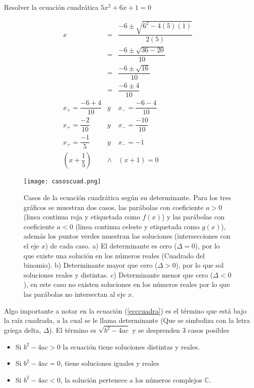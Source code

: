 \begin{myexample}
Resolver la ecuación cuadrática $5x^{2}+6x+1=0$
\end{myexample}
\begin{eqnarray*}
x&=&\dfrac{-6\pm\sqrt{6^{2}-4(5)(1)}}{2(5)}\\
&=&\dfrac{-6\pm\sqrt{36-20}}{10}\\
&=&\dfrac{-6\pm\sqrt{16}}{10}\\
&=&\dfrac{-6\pm 4}{10}\\
x_{+}=\dfrac{-6+ 4}{10} &y& x_{-}=\dfrac{-6- 4}{10}\\
x_{+}=\dfrac{-2}{10} &y& x_{-}=\dfrac{-10}{10}\\
x_{+}=\dfrac{-1}{5} &y& x_{-}=-1\\
\left(x+\dfrac{1}{5}\right)&\wedge &\left( x+1\right)=0
\end{eqnarray*}
\newpage
\begin{center}
\begin{figure}[h!]
\centering
\texttt{[image: casoscuad.png]}
\caption[Casos de la ecuación cuadrática según su determinante.]{Casos de la ecuación cuadrática según su determinante. Para los tres gráficos se muestran dos casos, las parábolas con coeficiente $a>0$ (linea continua roja y etiquetada como $f(x)$) y las parábolas con coeficiente $a<0$ (linea continua celeste y etiquetada como $g(x)$), además los puntos verdes muestran las soluciones (intersecciones con el eje $x$) de cada caso. a) El determinante es cero ($\Delta=0$), por lo que existe una solución en los números reales (Cuadrado del binomio). b) Determinante mayor que cero ($\Delta >0$), por lo que sol soluciones reales y distintas. c) Determinante menor que cero ($\Delta <0$), en este caso no existen soluciones en los números reales por lo que las parábolas no intersectan al eje $x$.}
\end{figure}
\end{center}

Algo importante a notar en la ecuación (\ref{ecccuadra}) es el término que está bajo la raíz cuadrada, a la cual se le llama determinante (Que se simboliza con la letra griega delta, $\Delta$). El término es $\sqrt{b^{2}-4ac}$ y se desprenden 3 casos posibles

\begin{itemize}
	\item Si $b^{2}-4ac>0$ la ecuación tiene soluciones distintas y reales.\\
	\item  Si $b^{2}-4ac=0$, tiene soluciones iguales y reales\\
	\item Si $b^{2}-4ac<0$, la solución pertenece a los números complejos $\mathbb{C}$.\\
\end{itemize}



